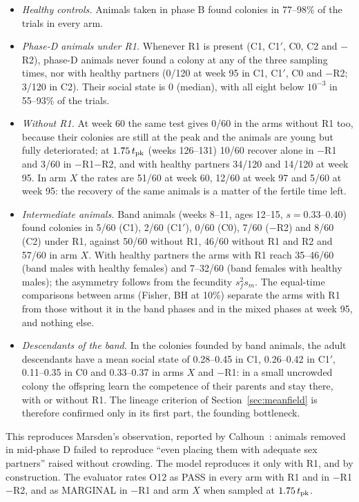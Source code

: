 \begin{itemize}
  \item \emph{Healthy controls.} Animals taken in phase B found colonies in 77--98\% of the trials in every arm.
  \item \emph{Phase-D animals under R1.} Whenever R1 is present (\textsf{C1}, \textsf{C1}$'$, \textsf{C0},
    \textsf{C2} and $-$R2), phase-D animals never found a colony at any of the three sampling times, nor with
    healthy partners (0/120 at week 95 in \textsf{C1}, \textsf{C1}$'$, \textsf{C0} and $-$R2; 3/120 in \textsf{C2}).
    Their social state is 0 (median), with all eight below $10^{-3}$ in 55--93\% of the trials.
  \item \emph{Without R1.} At week 60 the same test gives 0/60 in the arms without R1 too, because their colonies
    are still at the peak and the animals are young but fully deteriorated; at $1.75\,t_{\rm pk}$ (weeks 126--131)
    10/60 recover alone in $-$R1 and 3/60 in $-$R1$-$R2, and with healthy partners 34/120 and 14/120 at week 95. In
    arm $X$ the rates are 51/60 at week 60, 12/60 at week 97 and 5/60 at week 95: the recovery of the same
    animals is a matter of the fertile time left.
  \item \emph{Intermediate animals.} Band animals (weeks 8--11, ages 12--15, $s=0.33$--0.40) found colonies in
    5/60 (\textsf{C1}), 2/60 (\textsf{C1}$'$), 0/60 (\textsf{C0}), 7/60 ($-$R2) and 8/60 (\textsf{C2}) under R1,
    against 50/60 without R1, 46/60 without R1 and R2 and 57/60 in arm $X$. With healthy partners the arms with R1
    reach 35--46/60 (band males with healthy females) and 7--32/60 (band females with healthy males); the asymmetry
    follows from the fecundity $s_f^2s_m$. The equal-time comparisons between arms (Fisher, BH at 10\%) separate the
    arms with R1 from those without it in the band phases and in the mixed phases at week 95, and nothing else.
  \item \emph{Descendants of the band.} In the colonies founded by band animals, the adult descendants have a mean
    social state of 0.28--0.45 in \textsf{C1}, 0.26--0.42 in \textsf{C1}$'$, 0.11--0.35 in \textsf{C0} and
    0.33--0.37 in arms $X$ and $-$R1: in a small uncrowded colony the offspring learn the competence of their
    parents and stay there, with or without R1. The lineage criterion of Section~\ref{sec:meanfield} is therefore
    confirmed only in its first part, the founding bottleneck.
\end{itemize}
This reproduces Marsden's observation, reported by Calhoun~\cite{Calhoun1973}: animals removed in mid-phase D failed
to reproduce ``even placing them with adequate sex partners'' raised without crowding. The model reproduces it only
with R1, and by construction. The evaluator rates O12 as PASS in every arm with R1 and in $-$R1$-$R2, and as
MARGINAL in $-$R1 and arm $X$ when sampled at $1.75\,t_{\rm pk}$.

